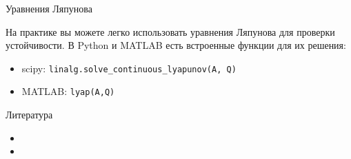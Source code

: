 \documentclass{beamer}
\begin{document}
\begin{frame}{Уравнения Ляпунова}
	\begin{flushleft}
		
		На практике вы можете легко использовать уравнения Ляпунова для проверки устойчивости. В Python и MATLAB есть встроенные функции для их решения:
		
		\begin{itemize}
			\item scipy: \texttt{linalg.solve\_continuous\_lyapunov(A, Q)}
			\item MATLAB: \texttt{lyap(A,Q)}
		\end{itemize}
		
	\end{flushleft}
\end{frame}






\begin{frame}{Литература}
\begin{flushleft}

\begin{itemize}
    \item {}
    \item {}
\end{itemize}

\end{flushleft}
\end{frame}




\myqrframe
\end{document}

